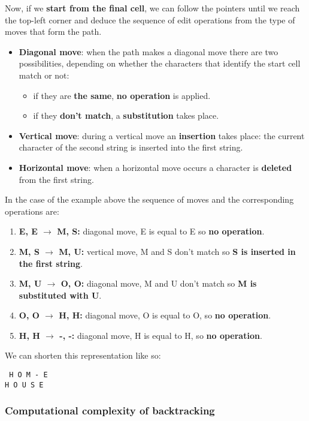 \documentclass[../main.tex]{subfiles}
\begin{document}
Now, if we \textbf{start from the final cell}, we can follow the pointers until we reach the top-left corner and deduce the sequence of edit operations from the type of moves that form the path.
\begin{itemize}
	\item \textbf{Diagonal move}: when the path makes a diagonal move there are two possibilities, depending on whether the characters that identify the start cell match or not:
	      \begin{itemize}
		      \item if they are \textbf{the same}, \textbf{no operation} is applied.
		      \item if they \textbf{don't match}, a \textbf{substitution} takes place.
	      \end{itemize}
	\item \textbf{Vertical move}: during a vertical move an \textbf{insertion} takes place: the current character of the second string is inserted into the first string.
	\item \textbf{Horizontal move}: when a horizontal move occurs a character is \textbf{deleted} from the first string.
\end{itemize}

In the case of the example above the sequence of moves and the corresponding operations are:
\begin{enumerate}
	\item \textbf{E, E $\rightarrow$ M, S:} diagonal move, E is equal to E so \textbf{no operation}.
	\item \textbf{M, S $\rightarrow$ M, U:} vertical move, M and S don't match so \textbf{S is inserted in the first string}.
	\item \textbf{M, U $\rightarrow$ O, O:} diagonal move, M and U don't match so \textbf{M is substituted with U}.
	\item \textbf{O, O $\rightarrow$ H, H:} diagonal move, O is equal to O, so \textbf{no operation}.
	\item \textbf{H, H $\rightarrow$ -, -:} diagonal move, H is equal to H, so \textbf{no operation}.
\end{enumerate}

We can shorten this representation like so:
\begin{center}
	\tt
	H O M - E \\
	H O U S E
\end{center}

\subsubsection{Computational complexity of backtracking}
\end{document}
